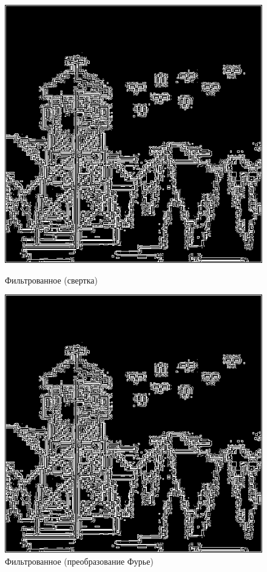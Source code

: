 \documentclass[a4paper]{article}
\begin{document}
\begin{figure}[H]
    \begin{minipage}{0.49\textwidth}
        \centering \includegraphics[width=\textwidth]{2/img_edge_by_conv2.png}
        \caption{Фильтрованное (свертка)}
    \end{minipage}
    \begin{minipage}{0.49\textwidth}
        \centering \includegraphics[width=\textwidth]{2/img_edge_by_fourier.png}
        \caption{Фильтрованное (преобразование Фурье)}
    \end{minipage}
\end{figure}\noindent\
\end{document}
